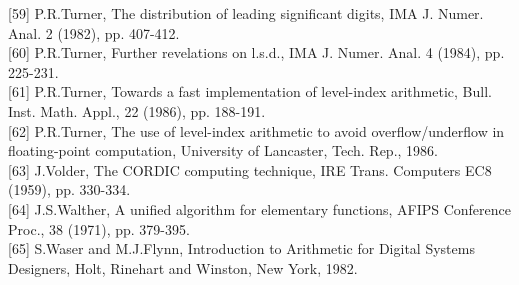 \documentclass[10pt]{article}
\begin{document}
[59] P.R.Turner, The distribution of leading significant digits, IMA J. Numer. Anal. 2 (1982), pp. 407-412.\\[0pt]
[60] P.R.Turner, Further revelations on l.s.d., IMA J. Numer. Anal. 4 (1984), pp. 225-231.\\[0pt]
[61] P.R.Turner, Towards a fast implementation of level-index arithmetic, Bull. Inst. Math. Appl., 22 (1986), pp. 188-191.\\[0pt]
[62] P.R.Turner, The use of level-index arithmetic to avoid overflow/underflow in floating-point computation, University of Lancaster, Tech. Rep., 1986.\\[0pt]
[63] J.Volder, The CORDIC computing technique, IRE Trans. Computers EC8 (1959), pp. 330-334.\\[0pt]
[64] J.S.Walther, A unified algorithm for elementary functions, AFIPS Conference Proc., 38 (1971), pp. 379-395.\\[0pt]
[65] S.Waser and M.J.Flynn, Introduction to Arithmetic for Digital Systems Designers, Holt, Rinehart and Winston, New York, 1982.
\end{document}
